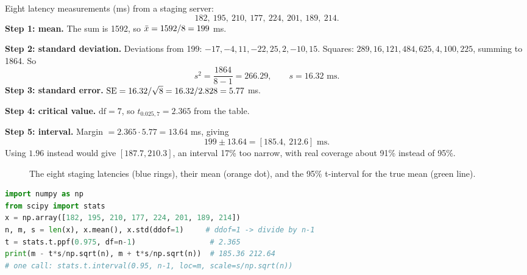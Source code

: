 \begin{walkbox}
Eight latency measurements (ms) from a staging server:
\[
  182,\ 195,\ 210,\ 177,\ 224,\ 201,\ 189,\ 214.
\]
\textbf{Step 1: mean.} The sum is 1592, so $\bar{x} = 1592/8 = 199$ ms.

\textbf{Step 2: standard deviation.} Deviations from 199:
$-17, -4, 11, -22, 25, 2, -10, 15$. Squares: $289, 16, 121, 484, 625, 4, 100,
225$, summing to 1864. So
\[
  s^2 = \frac{1864}{8-1} = 266.29, \qquad s = 16.32 \text{ ms}.
\]
\textbf{Step 3: standard error.} $\operatorname{SE} = 16.32/\sqrt 8 = 16.32/2.828 = 5.77$ ms.

\textbf{Step 4: critical value.} $\text{df} = 7$, so $t_{0.025,7} = 2.365$
from the table.

\textbf{Step 5: interval.} Margin $= 2.365 \cdot 5.77 = 13.64$ ms, giving
\[
  199 \pm 13.64 = [185.4,\ 212.6] \text{ ms}.
\]
Using $1.96$ instead would give $[187.7, 210.3]$, an interval 17\% too narrow,
with real coverage about 91\% instead of 95\%.
\end{walkbox}

\begin{figure}[H]
\centering
{}
\caption{The eight staging latencies (blue rings), their mean (orange dot), and the 95\% t-interval for the true mean (green line).}
\label{fig:ci-staging-example}
\end{figure}

\begin{lstlisting}[language=Python]
import numpy as np
from scipy import stats
x = np.array([182, 195, 210, 177, 224, 201, 189, 214])
n, m, s = len(x), x.mean(), x.std(ddof=1)     # ddof=1 -> divide by n-1
t = stats.t.ppf(0.975, df=n-1)                 # 2.365
print(m - t*s/np.sqrt(n), m + t*s/np.sqrt(n))  # 185.36 212.64
# one call: stats.t.interval(0.95, n-1, loc=m, scale=s/np.sqrt(n))
\end{lstlisting}


